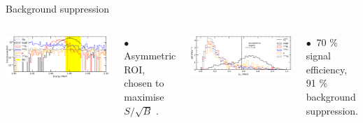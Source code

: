 \documentclass [aspectratio=169]{beamer}
\begin{document}
\begin{frame}{Background suppression}
\begin{columns}
\includegraphics[scale=0.55]{bkgndROI.png}

$\bullet~$ Asymmetric ROI, chosen to maximise $S/\sqrt{B}$ .

\includegraphics[scale=0.55]{topoSel.png}

$\bullet~$ 70 \% signal efficiency, 91 \% background suppression.

 \end{columns}
\end{frame}
\end{document}
